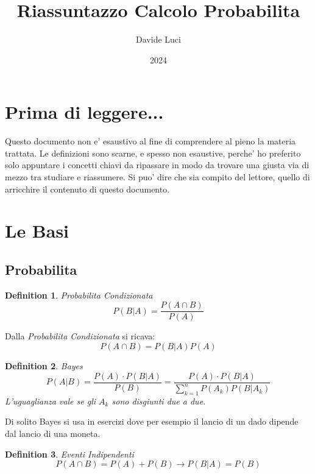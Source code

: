 \documentclass{article}
\title{Riassuntazzo Calcolo Probabilita}
\author{Davide Luci}
\date{2024}
\newtheorem{definition}{Definition}[section]
\begin{document}
    \maketitle
    \tableofcontents
    \newpage


    \setlength{\parindent}{0pt}
    \section{ Prima di leggere...}
    Questo documento non e' esaustivo al fine di comprendere al pieno la materia trattata.
    Le definizioni sono scarne, e spesso non esaustive, perche' ho preferito solo appuntare i concetti chiavi
    da ripassare in modo da trovare una giusta via di mezzo tra studiare e riassumere. Si puo' dire che sia compito del 
    lettore, quello di arricchire il contenuto di questo documento.

    \newpage

    \section{ Le Basi}
    \subsection{Probabilita}
    \begin{definition} Probabilita Condizionata \\
        $$
        P(B|A) = \frac{P(A \cap B)}{P(A)}
        $$
    \end{definition}

    Dalla \textit{Probabilita Condizionata} si ricava:
    $$
    P(A \cap B) = P(B|A) P(A)
    $$

    \begin{definition} Bayes
        $$
        P(A|B) = \frac{P(A) \cdot P(B|A)}{P(B)} = \frac{P(A) \cdot P(B|A)}{\sum_{k=1}^n P(A_k)P(B|A_k)} 
        $$
        L'uguaglianza vale se gli $A_k$ sono disgiunti due a due.
    \end{definition}

    Di solito Bayes si usa in esercizi dove per esempio il lancio di un dado dipende dal lancio di una moneta.

    \begin{definition} Eventi Indipendenti
        $$
        P(A \cap B) = P(A) + P(B) \to P(B|A) = P(B)
        $$
    \end{definition}
\end{document}
